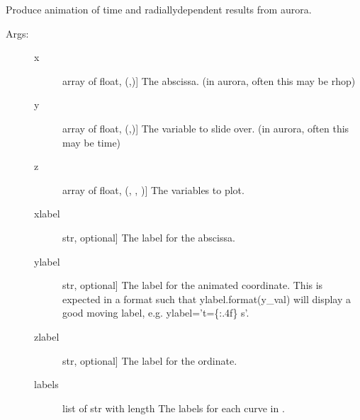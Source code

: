 \documentclass[letterpaper,10pt,english]{sphinxmanual}
\begin{document}
\begin{fulllineitems}
\label{\detokenize{aurora:aurora.animate.animate_aurora}}
Produce animation of time\sphinxhyphen{} and radially\sphinxhyphen{}dependent results from aurora.
\begin{description}
\item[{Args:}] \leavevmode\begin{description}
\item[{x}] \leavevmode{[}array of float, (,){]}
The abscissa. (in aurora, often this may be rhop)

\item[{y}] \leavevmode{[}array of float, (,){]}
The variable to slide over. (in aurora, often this may be time)

\item[{z}] \leavevmode{[}array of float, (, , ){]}
The variables to plot.

\item[{xlabel}] \leavevmode{[}str, optional{]}
The label for the abscissa.

\item[{ylabel}] \leavevmode{[}str, optional{]}
The label for the animated coordinate. This is expected in a format such that ylabel.format(y\_val)
will display a good moving label, e.g. ylabel=’t=\{:.4f\} s’.

\item[{zlabel}] \leavevmode{[}str, optional{]}
The label for the ordinate.

\item[{labels}] \leavevmode{[}list of str with length \sphinxtitleref{P}{]}
The labels for each curve in .


\end{description}
\end{description}
\end{fulllineitems}
\end{document}
